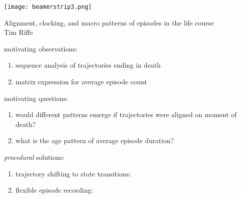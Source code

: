 \documentclass[20pt,usenames,dvipsnames]{beamer}
\begin{document}

\begin{frame}[plain]
	\vspace{-3cm}
 \centerline{\texttt{[image: beamerstrip3.png]}}

	
	\huge
	\vspace{1em}
	
	Alignment, clocking, and macro patterns of episodes in the life course\\
	\vspace{1em}
	\large 
	Tim Riffe 
\end{frame}

\begin{frame}[plain]
\Large
{} motivating observations:\vspace{2em}
 \begin{enumerate}[<+->]
 \item sequence analysis of trajectories ending in death  
 \item matrix expression for average episode count  
 \end{enumerate}
\end{frame}
%

\begin{frame}[plain]
\Large
{} motivating questions:\vspace{2em}
 \begin{enumerate}
 \item would different patterns emerge if trajectories were aligned on moment of death?
 \item what is the age pattern of average episode duration?
 \end{enumerate}
\end{frame}
%

\begin{frame}[plain]
\Large
{} \emph{procedural} solutions:\vspace{2em}
 \begin{enumerate}
 \item trajectory shifting to state transitions: 
 \item flexible episode recording: 
 \end{enumerate}
\end{frame}
%
\end{document}
